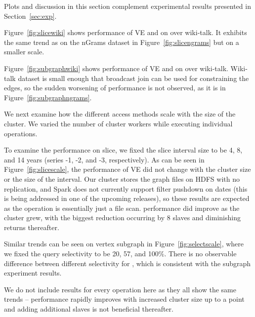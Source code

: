 Plots and discussion in this section complement experimental results
presented in Section~\ref{sec:exp}.

Figure~\ref{fig:slicewiki} shows performance of VE and \sg
on  over wiki-talk.  It exhibits the same trend as on the
nGrams dataset in Figure~\ref{fig:slicengrams} but on a smaller scale.

Figure~\ref{fig:subgraphwiki} shows performance of VE and \sg
on  over wiki-talk.  Wiki-talk dataset is small
enough that broadcast join can be used for constraining the edges, so
the sudden worsening of performance is not observed, as it is in
Figure~\ref{fig:subgraphngrams}.

We next examine how the different access methods scale with the size
of the cluster.  We varied the number of cluster workers while
executing individual operations.

To examine the performance on slice, we fixed the slice interval size
to be 4, 8, and 14 years (series -1, -2, and -3, respectively).  As
can be seen in Figure~\ref{fig:slicescale}, the performance of VE did
not change with the cluster size or the size of the interval.  Our
cluster stores the graph files on HDFS with no replication, and Spark
does not currently support filter pushdown on dates (this is being
addressed in one of the upcoming releases), so these results are
expected as the operation is essentially just a file scan.  \rg
performance did improve as the cluster grew, with the biggest
reduction occurring by 8 slaves and diminishing returns thereafter. 

Similar trends can be seen on vertex subgraph in
Figure~\ref{fig:selectscale}, where we fixed the query selectivity to
be 20, 57, and 100\%.  There is no observable difference between
different selectivity for \rg, which is consistent with the subgraph
experiment results.

We do not include results for every operation here as they all show
the same trends -- performance rapidly improves with increased cluster
size up to a point and adding additional slaves is not beneficial
thereafter.  


